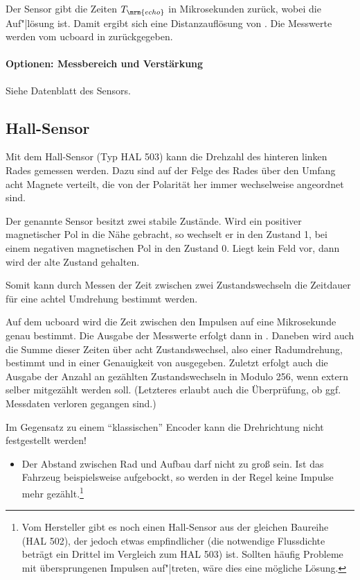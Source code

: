 Der Sensor gibt die Zeiten $T_\mrm{echo}$ in Mikrosekunden zurück, wobei die Auf"|lösung  ist. Damit ergibt sich eine Distanzauflösung von \ca {}. Die Messwerte werden vom ucboard in  zurückgegeben.


\paragraph{Optionen: Messbereich und Verstärkung}

Siehe Datenblatt des Sensors.


\subsection{Hall-Sensor}

Mit dem Hall-Sensor (Typ HAL 503) kann die Drehzahl des hinteren linken Rades gemessen werden. Dazu sind auf der Felge des Rades über den Umfang acht Magnete verteilt, die von der Polarität her immer wechselweise angeordnet sind.

Der genannte Sensor besitzt zwei stabile Zustände. Wird ein positiver magnetischer Pol in die Nähe gebracht, so wechselt er in den Zustand 1, bei einem negativen magnetischen Pol in den Zustand 0. Liegt kein Feld vor, dann wird der alte Zustand gehalten. 

Somit kann durch Messen der Zeit zwischen zwei Zustandswechseln die Zeitdauer für eine achtel Umdrehung bestimmt werden. 

Auf dem ucboard wird die Zeit zwischen den Impulsen auf eine Mikrosekunde genau bestimmt. Die Ausgabe der Messwerte erfolgt dann in . Daneben wird auch die Summe dieser Zeiten über acht Zustandswechsel, also einer Radumdrehung, bestimmt und in einer Genauigkeit von  ausgegeben. Zuletzt erfolgt auch die Ausgabe der Anzahl an gezählten Zustandswechseln in Modulo 256, wenn extern selber mitgezählt werden soll. (Letzteres erlaubt auch die Überprüfung, ob ggf. Messdaten verloren gegangen sind.)

Im Gegensatz zu einem "`klassischen"' Encoder kann die Drehrichtung nicht festgestellt werden!

\begin{itemize}
	\item Der Abstand zwischen Rad und Aufbau darf nicht zu groß sein. Ist das Fahrzeug beispielsweise aufgebockt, so werden in der Regel keine Impulse mehr gezählt.\footnote{Vom Hersteller gibt es noch einen Hall-Sensor aus der gleichen Baureihe (HAL 502), der jedoch etwas empfindlicher (die notwendige Flussdichte beträgt \ca ein Drittel im Vergleich zum HAL 503) ist. Sollten häufig Probleme mit übersprungenen Impulsen auf"|treten, wäre dies eine mögliche Lösung.}
\end{itemize}


